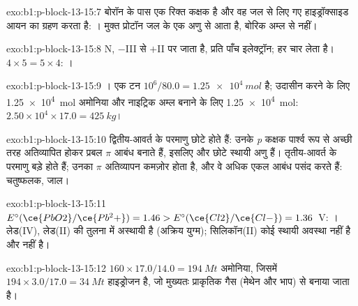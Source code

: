 \begin{solution}{exo:b1:p-block-13-15:7}
बोरॉन के पास एक रिक्त कक्षक है और वह जल से लिए गए हाइड्रॉक्साइड आयन का
 ग्रहण करता है: । मुक्त
प्रोटॉन जल के एक अणु से आता है, बोरिक अम्ल से नहीं।
\end{solution}

\begin{solution}{exo:b1:p-block-13-15:8}
N, $-$III से $+$II पर जाता है, प्रति  पाँच इलेक्ट्रॉन; हर 
चार लेता है। $4 \times 5 = 5 \times 4$: ।
\end{solution}

\begin{solution}{exo:b1:p-block-13-15:9}
। एक टन $10^6/80.0 = \qty{1.25e4}{mol}$ है;
उदासीन करने के लिए \qty{1.25e4}{mol} अमोनिया और नाइट्रिक अम्ल बनाने के लिए
\qty{1.25e4}{mol}: $2.50 \times 10^4 \times 17.0 = \qty{425}{kg}$।
\end{solution}

\begin{solution}{exo:b1:p-block-13-15:10}
द्वितीय-आवर्त के परमाणु छोटे होते हैं: उनके \textit{p} कक्षक पार्श्व रूप से अच्छी तरह
अतिव्यापित होकर प्रबल $\pi$ आबंध बनाते हैं, इसलिए  और  छोटे
स्थायी अणु हैं। तृतीय-आवर्त के परमाणु बड़े होते हैं; उनका $\pi$ अतिव्यापन
कमज़ोर होता है, और वे अधिक एकल आबंध पसंद करते हैं:  चतुष्फलक,
 जाल।
\end{solution}

\begin{solution}{exo:b1:p-block-13-15:11}
$E^\circ(\ce{PbO2}/\ce{Pb^2+}) = 1.46 > E^\circ(\ce{Cl2}/\ce{Cl-}) = 1.36$~V:
। लेड(IV), लेड(II) की तुलना में
अस्थायी है (अक्रिय युग्म); सिलिकॉन(II) कोई स्थायी अवस्था नहीं है और
  नहीं है।
\end{solution}

\begin{solution}{exo:b1:p-block-13-15:12}
$160 \times 17.0/14.0 = \qty{194}{Mt}$ अमोनिया, जिसमें $194 \times
3.0/17.0 = \qty{34}{Mt}$ हाइड्रोजन है, जो मुख्यतः प्राकृतिक गैस
(मेथेन और भाप) से बनाया जाता है।
\end{solution}

